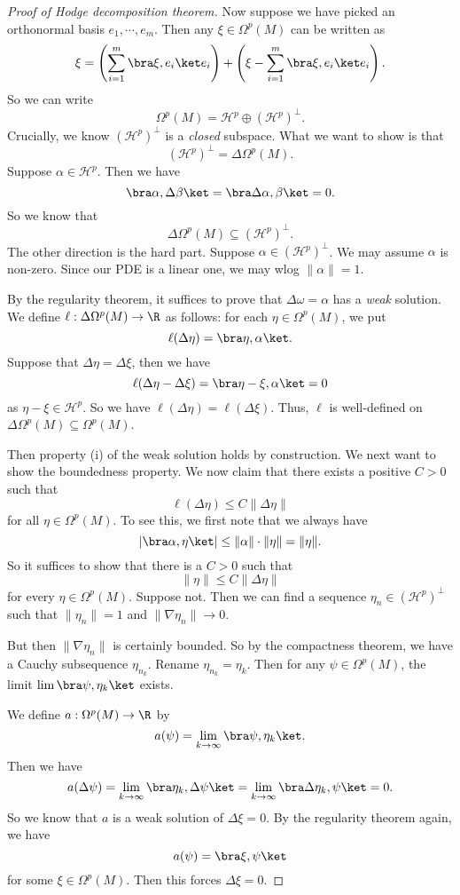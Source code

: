 \documentclass[a4paper]{article}
\begin{document}
\begin{proof}[Proof of Hodge decomposition theorem]
  Now suppose we have picked an orthonormal basis $e_1, \cdots, e_m$. Then any $\xi \in \Omega^p(M)$ can be written as
  \[
    \xi = \left(\sum_{i = 1}^m \bra \xi, e_i\ket e_i\right) + \left(\xi - \sum_{i = 1}^m \bra \xi, e_i\ket e_i\right).
  \]
  So we can write
  \[
    \Omega^p(M) = \mathcal{H}^p \oplus (\mathcal{H}^p)^\perp.
  \]
  Crucially, we know $(\mathcal{H}^p)^\perp$ is a \emph{closed} subspace. What we want to show is that
  \[
    (\mathcal{H}^p)^\perp = \Delta \Omega^p(M).
  \]
  Suppose $\alpha \in \mathcal{H}^p$. Then we have
  \[
    \bra \alpha, \Delta \beta\ket = \bra \Delta \alpha, \beta\ket = 0.
  \]
  So we know that
  \[
    \Delta \Omega^p(M) \subseteq (\mathcal{H}^p)^\perp.
  \]
  The other direction is the hard part. Suppose $\alpha \in (\mathcal{H}^p)^\perp$. We may assume $\alpha$ is non-zero. Since our PDE is a linear one, we may wlog $\|\alpha\| = 1$.

  By the regularity theorem, it suffices to prove that $\Delta \omega = \alpha$ has a \emph{weak} solution. We define $\ell: \Delta \Omega^p(M) \to \R$ as follows: for each $\eta \in \Omega^p(M)$, we put
  \[
    \ell (\Delta \eta) = \bra \eta, \alpha\ket.
  \]
  Suppose that $\Delta \eta = \Delta \xi$, then we have
  \[
    \ell(\Delta \eta - \Delta \xi) = \bra \eta - \xi, \alpha\ket = 0
  \]
  as $\eta - \xi \in \mathcal{H}^p$. So we have $\ell(\Delta \eta) = \ell(\Delta \xi)$. Thus, $\ell$ is well-defined on $\Delta \Omega^p(M) \subseteq \Omega^p(M)$.

  Then property (i) of the weak solution holds by construction. We next want to show the boundedness property. We now claim that there exists a positive $C > 0$ such that
  \[
    \ell(\Delta \eta)\leq C \|\Delta \eta\|
  \]
  for all $\eta \in \Omega^p(M)$. To see this, we first note that we always have
  \[
    |\bra \alpha, \eta\ket| \leq \|\alpha\| \cdot \|\eta\| = \|\eta\|.
  \]
  So it suffices to show that there is a $C > 0$ such that
  \[
    \|\eta\| \leq C\|\Delta \eta\|
  \]
  for every $\eta \in \Omega^p(M)$. Suppose not. Then we can find a sequence $\eta_n \in (\mathcal{H}^p)^{\perp}$ such that $\|\eta_n\| = 1$ and $\|\nabla \eta_n\| \to 0$.

  But then $\|\nabla \eta_n\|$ is certainly bounded. So by the compactness theorem, we have a Cauchy subsequence $\eta_{n_k}$. Rename $\eta_{n_k} = \eta_k$. Then for any $\psi \in \Omega^p(M)$, the limit $\lim \bra \psi, \eta_k\ket$ exists.

  We define $a: \Omega^p(M) \to \R$ by
  \[
    a(\psi) = \lim_{k \to \infty} \bra \psi, \eta_k\ket.
  \]
  Then we have
  \[
    a(\Delta \psi) = \lim_{k \to \infty} \bra \eta_k, \Delta \psi\ket = \lim_{k \to \infty} \bra \Delta \eta_k, \psi\ket = 0.
  \]
  So we know that $a$ is a weak solution of $\Delta \xi = 0$. By the regularity theorem again, we have
  \[
    a(\psi) = \bra \xi, \psi\ket
  \]
  for some $\xi \in \Omega^p(M)$. Then this forces $\Delta \xi = 0$.


\end{proof}
\end{document}
